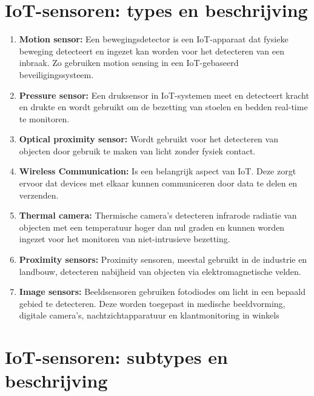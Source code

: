 \section{IoT-sensoren: types en beschrijving} \autocite{Moyer2019, Sehrawat2019, Kumar2024, Balogun2017, Meenakshi2020, Tresanchez2018, Shanmugavalli2023, Gala2020, Gade2013, Chidurala2021, Karunarathne2018, Srinivasan2022}

\begin{enumerate}
    \item \textbf{Motion sensor:} Een bewegingsdetector is een IoT-apparaat dat fysieke beweging detecteert en ingezet kan worden voor het detecteren van een inbraak. Zo gebruiken \autocite{Tiong2019} motion sensing in een IoT-gebaseerd beveiligingssysteem.
    
    \item \textbf{Pressure sensor:} Een druksensor in IoT-systemen meet en detecteert kracht en drukte en wordt gebruikt om de bezetting van stoelen en bedden real-time te monitoren.
    
    \item \textbf{Optical proximity sensor:} Wordt gebruikt voor het detecteren van objecten door gebruik te maken van licht zonder fysiek contact.
    
    \item \textbf{Wireless Communication:} Is een belangrijk aspect van IoT. Deze zorgt ervoor dat devices met elkaar kunnen communiceren door data te delen en verzenden.
    
    \item \textbf{Thermal camera:} Thermische camera's detecteren infrarode radiatie van objecten met een temperatuur hoger dan nul graden en kunnen worden ingezet voor het monitoren van niet-intrusieve bezetting.
    
    \item \textbf{Proximity sensors:} Proximity sensoren, meestal gebruikt in de industrie en landbouw, detecteren nabijheid van objecten via elektromagnetische velden.
    
    \item \textbf{Image sensors:} Beeldsensoren gebruiken fotodiodes om licht in een bepaald gebied te detecteren. Deze worden toegepast in medische beeldvorming, digitale camera's, nachtzichtapparatuur  en klantmonitoring in winkels
\end{enumerate}


\section{IoT-sensoren: subtypes en beschrijving}\\

